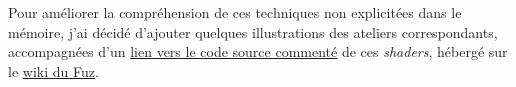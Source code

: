 Pour améliorer la compréhension de ces techniques non explicitées dans le mémoire, j'ai décidé d'ajouter quelques illustrations des ateliers correspondants, accompagnées d'un \href{https://wiki.fuz.re/doku.php?id=atelier:creative_coding:code_des_ateliers}{lien vers le code source commenté} de ces \textit{shaders}, hébergé sur le \href{https://wiki.fuz.re/doku.php?id=start}{wiki du Fuz}.















